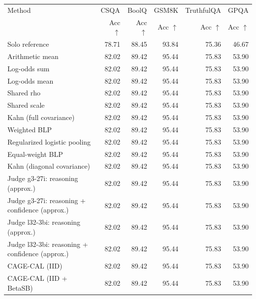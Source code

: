 \begin{tabular}{lrrrrr}
\toprule
Method & \multicolumn{1}{c}{CSQA} & \multicolumn{1}{c}{BoolQ} & \multicolumn{1}{c}{GSM8K} & \multicolumn{1}{c}{TruthfulQA} & \multicolumn{1}{c}{GPQA} \\
 & Acc $\uparrow$ & Acc $\uparrow$ & Acc $\uparrow$ & Acc $\uparrow$ & Acc $\uparrow$ \\
\midrule
Solo reference & 78.71 & 88.45 & 93.84 & 75.36 & 46.67 \\
Arithmetic mean & 82.02 & 89.42 & 95.44 & 75.83 & 53.90 \\
Log-odds sum & 82.02 & 89.42 & 95.44 & 75.83 & 53.90 \\
Log-odds mean & 82.02 & 89.42 & 95.44 & 75.83 & 53.90 \\
Shared rho & 82.02 & 89.42 & 95.44 & 75.83 & 53.90 \\
Shared scale & 82.02 & 89.42 & 95.44 & 75.83 & 53.90 \\
Kahn (full covariance) & 82.02 & 89.42 & 95.44 & 75.83 & 53.90 \\
Weighted BLP & 82.02 & 89.42 & 95.44 & 75.83 & 53.90 \\
Regularized logistic pooling & 82.02 & 89.42 & 95.44 & 75.83 & 53.90 \\
Equal-weight BLP & 82.02 & 89.42 & 95.44 & 75.83 & 53.90 \\
Kahn (diagonal covariance) & 82.02 & 89.42 & 95.44 & 75.83 & 53.90 \\
Judge g3-27i: reasoning (approx.) & 82.02 & 89.42 & 95.44 & 75.83 & 53.90 \\
Judge g3-27i: reasoning + confidence (approx.) & 82.02 & 89.42 & 95.44 & 75.83 & 53.90 \\
Judge l32-3bi: reasoning (approx.) & 82.02 & 89.42 & 95.44 & 75.83 & 53.90 \\
Judge l32-3bi: reasoning + confidence (approx.) & 82.02 & 89.42 & 95.44 & 75.83 & 53.90 \\
CAGE-CAL (IID) & 82.02 & 89.42 & 95.44 & 75.83 & 53.90 \\
CAGE-CAL (IID + BetaSB) & 82.02 & 89.42 & 95.44 & 75.83 & 53.90 \\
\bottomrule
\end{tabular}
